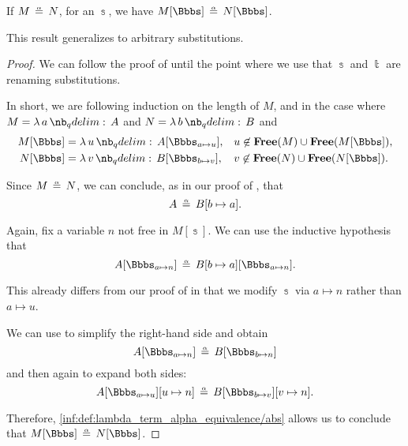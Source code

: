 \begin{proposition}\label{thm:substitution_on_alpha_equivalent_terms}
  If \( M \aequiv N \), for an \hyperref[def:lambda_substitution]{} \( \Bbbs \), we have \( M[\Bbbs] \aequiv N[\Bbbs] \).
\end{proposition}
\begin{comments}
  \item This result generalizes  to arbitrary substitutions.
\end{comments}
\begin{proof}
  We can follow the proof of  until the point where we use that \( \Bbbs \) and \( \Bbbt \) are renaming substitutions.

  In short, we are following induction on the length of \( M \), and in the case where \( M = \qabs a A \) and \( N = \qabs b B \) and
  \begin{align*}
    M[\Bbbs] &= \qabs u A[\Bbbs_{a \mapsto u}], &&u \not\in \op*{Free}(M) \cup \op*{Free}(M[\Bbbs]), \\
    N[\Bbbs] &= \qabs v B[\Bbbs_{b \mapsto v}], &&v \not\in \op*{Free}(N) \cup \op*{Free}(N[\Bbbs]).
  \end{align*}

  Since \( M \aequiv N \), we can conclude, as in our proof of , that
  \begin{equation*}
    A \aequiv B[b \mapsto a].
  \end{equation*}

  Again, fix a variable \( n \) not free in \( M[\Bbbs] \). We can use the inductive hypothesis that
  \begin{equation*}
    A[\Bbbs_{a \mapsto n}] \aequiv B[b \mapsto a][\Bbbs_{a \mapsto n}].
  \end{equation*}

  This already differs from our proof of  in that we modify \( \Bbbs \) via \( a \mapsto n \) rather than \( a \mapsto u \).

  We can use  to simplify the right-hand side and obtain
  \begin{equation*}
    A[\Bbbs_{a \mapsto n}] \aequiv B[\Bbbs_{b \mapsto n}]
  \end{equation*}
  and then again to expand both sides:
  \begin{equation*}
    A[\Bbbs_{a \mapsto u}][u \mapsto n] \aequiv B[\Bbbs_{b \mapsto v}][v \mapsto n].
  \end{equation*}

  Therefore, \ref{inf:def:lambda_term_alpha_equivalence/abs} allows us to conclude that \( M[\Bbbs] \aequiv N[\Bbbs] \).
\end{proof}

